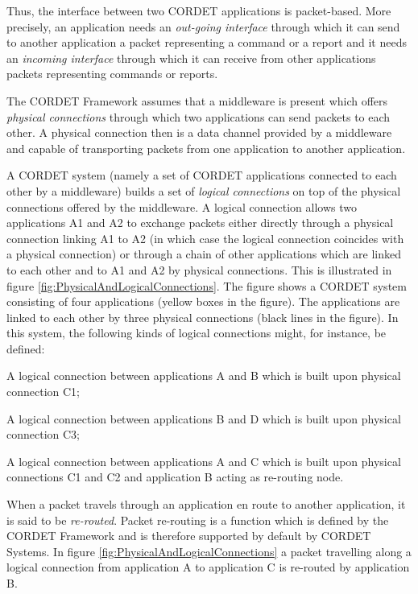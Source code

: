 \documentclass[a4paper,10pt]{article}
\newenvironment{fw_enumerate}					%
{\begin{enumerate}
  \setlength{\itemsep}{1mm}
  \setlength{\parskip}{0pt}
  \setlength{\parsep}{0pt}}
{\end{enumerate}}
\begin{document}
Thus, the interface between two CORDET applications is packet-based. More precisely, an application needs an \textit{out-going interface} through which it can send to another application a packet representing a command or a report and it needs an \textit{incoming interface} through which it can receive from other applications packets representing commands or reports.  

The CORDET Framework assumes that a middleware is present which offers \textit{physical connections} through which two applications can send packets to each other. A physical connection then is a data channel provided by a middleware and capable of transporting packets from one application to another application. 

A CORDET system (namely a set of CORDET applications connected to each other by a middleware) builds a set of \textit{logical connections} on top of the physical connections offered by the middleware. A logical connection allows two applications A1 and A2 to exchange packets either directly through a physical connection linking A1 to A2 (in which case the logical connection coincides with a physical connection) or through a chain of other applications which are linked to each other and to A1 and A2 by physical connections. This is illustrated in figure \ref{fig:PhysicalAndLogicalConnections}. The figure shows a CORDET system consisting of four applications (yellow boxes in the figure). The applications are linked to each other by three physical connections (black lines in the figure). In this system, the following kinds of logical connections might, for instance, be defined:

\begin{fw_enumerate}
\item A logical connection between applications A and B which is built upon physical connection C1;
\item A logical connection between applications B and D which is built upon physical connection C3;
\item A logical connection between applications A and C which is built upon physical connections C1 and C2 and application B acting as re-routing node.
\end{fw_enumerate}

When a packet travels through an application en route to another application, it is said to be \textit{re-routed}. Packet re-routing is a function which is defined by the CORDET Framework and is therefore supported by default by CORDET Systems. In figure \ref{fig:PhysicalAndLogicalConnections} a packet travelling along a logical connection from application A to application C is re-routed by application B.
\end{document}
